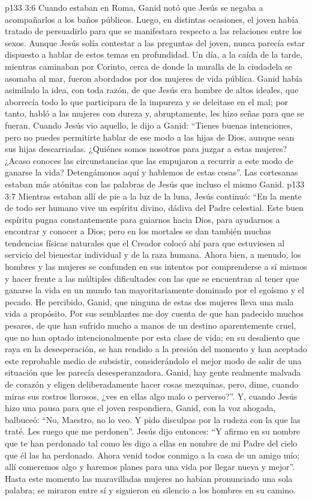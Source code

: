 \vs p133 3:6 Cuando estaban en Roma, Ganid notó que Jesús se negaba a acompañarlos a los baños públicos. Luego, en distintas ocasiones, el joven había tratado de persuadirlo para que se manifestara respecto a las relaciones entre los sexos. Aunque Jesús solía contestar a las preguntas del joven, nunca parecía estar dispuesto a hablar de estos temas en profundidad. Un día, a la caída de la tarde, mientras caminaban por Corinto, cerca de donde la muralla de la ciudadela se asomaba al mar, fueron abordados por dos mujeres de vida pública. Ganid había asimilado la idea, con toda razón, de que Jesús era hombre de altos ideales, que aborrecía todo lo que participara de la impureza y se deleitase en el mal; por tanto, habló a las mujeres con dureza y, abruptamente, les hizo señas para que se fueran. Cuando Jesús vio aquello, le dijo a Ganid: “Tienes buenas intenciones, pero no puedes permitirte hablar de ese modo a las hijas de Dios, aunque sean sus hijas descarriadas. ¿Quiénes somos nosotros para juzgar a estas mujeres? ¿Acaso conoces las circunstancias que las empujaron a recurrir a este modo de ganarse la vida? Detengámonos aquí y hablemos de estas cosas”. Las cortesanas estaban más atónitas con las palabras de Jesús que incluso el mismo Ganid.
\vs p133 3:7 Mientras estaban allí de pie a la luz de la luna, Jesús continuó: “En la mente de todo ser humano vive un espíritu divino, dádiva del Padre celestial. Este buen espíritu pugna constantemente para guiarnos hacia Dios, para ayudarnos a encontrar y conocer a Dios; pero en los mortales se dan también muchas tendencias físicas naturales que el Creador colocó ahí para que estuviesen al servicio del bienestar individual y de la raza humana. Ahora bien, a menudo, los hombres y las mujeres se confunden en sus intentos por comprenderse a sí mismos y hacer frente a las múltiples dificultades con las que se encuentran al tener que ganarse la vida en un mundo tan mayoritariamente dominado por el egoísmo y el pecado. He percibido, Ganid, que ninguna de estas dos mujeres lleva una mala vida a propósito. Por sus semblantes me doy cuenta de que han padecido muchos pesares, de que han sufrido mucho a manos de un destino aparentemente cruel, que no han optado intencionalmente por esta clase de vida; en su desaliento que raya en la desesperación, se han rendido a la presión del momento y han aceptado este reprobable medio de subsistir, considerándolo el mejor modo de salir de una situación que les parecía desesperanzadora. Ganid, hay gente realmente malvada de corazón y eligen deliberadamente hacer cosas mezquinas, pero, dime, cuando miras sus rostros llorosos, ¿ves en ellas algo malo o perverso?”. Y, cuando Jesús hizo una pausa para que el joven respondiera, Ganid, con la voz ahogada, balbuceó: “No, Maestro, no lo veo. Y pido disculpas por la rudeza con la que las traté. Les ruego que me perdonen”. Jesús dijo entonces: “Y afirmo en su nombre que te han perdonado tal como les digo a ellas en nombre de mi Padre del cielo que él las ha perdonado. Ahora venid todos conmigo a la casa de un amigo mío; allí comeremos algo y haremos planes para una vida por llegar nueva y mejor”. Hasta este momento las maravilladas mujeres no habían pronunciado una sola palabra; se miraron entre sí y siguieron en silencio a los hombres en su camino.
